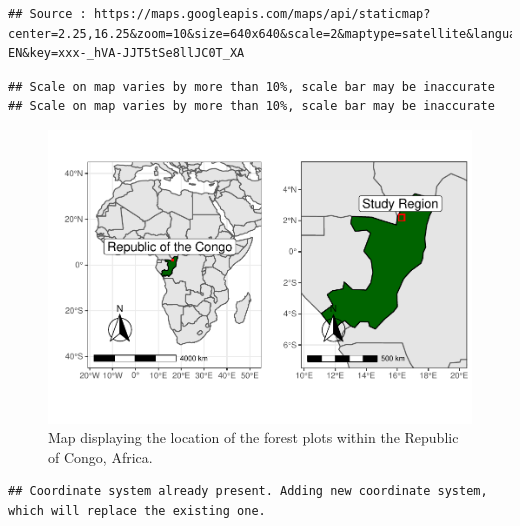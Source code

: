 \documentclass[12pt,]{article}
\begin{document}
\begin{verbatim}
## Source : https://maps.googleapis.com/maps/api/staticmap?center=2.25,16.25&zoom=10&size=640x640&scale=2&maptype=satellite&language=en-EN&key=xxx-_hVA-JJT5tSe8llJC0T_XA
\end{verbatim}

\begin{verbatim}
## Scale on map varies by more than 10%, scale bar may be inaccurate
## Scale on map varies by more than 10%, scale bar may be inaccurate
\end{verbatim}

\begin{figure}
\centering
\includegraphics{Project_Template_files/figure-latex/mapping1-1.pdf}
\caption{Map displaying the location of the forest plots within the
Republic of Congo, Africa.}
\end{figure}

\begin{verbatim}
## Coordinate system already present. Adding new coordinate system, which will replace the existing one.
\end{verbatim}
\end{document}

